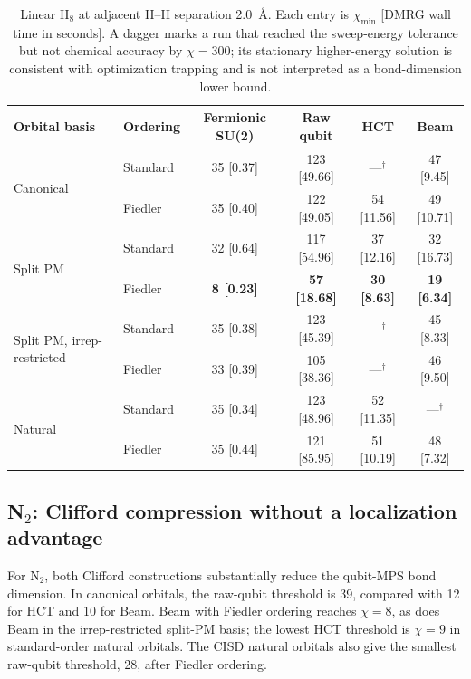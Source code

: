 \documentclass[a4paper,onecolumn,10pt]{article}
\begin{document}
\begin{table}[htbp]
\centering
\caption{Linear H$_8$ at adjacent H--H separation 2.0~\AA.  Each entry is
$\chi_{\min}$ [DMRG wall time in seconds].  A dagger marks a run that reached
the sweep-energy tolerance but not chemical accuracy by $\chi=300$; its
stationary higher-energy solution is consistent with optimization trapping
and is not interpreted as a bond-dimension lower bound.}
\label{tab:h8-orbital-dmrg}
\begin{tabular}{llcccc}
\toprule
Orbital basis & Ordering & Fermionic SU(2) & Raw qubit & HCT & Beam \\
\midrule
\multirow{2}{*}{Canonical}
 & Standard & 35 [0.37] & 123 [49.66] & ---$^\dagger$ & 47 [9.45] \\
 & Fiedler  & 35 [0.40] & 122 [49.05] & 54 [11.56] & 49 [10.71] \\
\midrule
\multirow{2}{*}{Split PM}
 & Standard & 32 [0.64] & 117 [54.96] & 37 [12.16] & 32 [16.73] \\
 & Fiedler  & \textbf{8 [0.23]} & \textbf{57 [18.68]}
             & \textbf{30 [8.63]} & \textbf{19 [6.34]} \\
\midrule
\multirow{2}{*}{Split PM, irrep-restricted}
 & Standard & 35 [0.38] & 123 [45.39] & ---$^\dagger$ & 45 [8.33] \\
 & Fiedler  & 33 [0.39] & 105 [38.36] & ---$^\dagger$ & 46 [9.50] \\
\midrule
\multirow{2}{*}{Natural}
 & Standard & 35 [0.34] & 123 [48.96] & 52 [11.35] & ---$^\dagger$ \\
 & Fiedler  & 35 [0.44] & 121 [85.95] & 51 [10.19] & 48 [7.32] \\
\bottomrule
\end{tabular}
\end{table}

\subsection{\texorpdfstring{N$_2$}{N2}: Clifford compression without a localization advantage}

For N$_2$, both Clifford constructions substantially reduce the qubit-MPS
bond dimension.  In canonical orbitals, the raw-qubit threshold is 39,
compared with 12 for HCT and 10 for Beam.  Beam with Fiedler ordering reaches
$\chi=8$, as does Beam in the irrep-restricted split-PM basis; the lowest HCT
threshold is $\chi=9$ in standard-order natural orbitals.  The CISD natural
orbitals also give the smallest raw-qubit threshold, 28, after Fiedler
ordering.
\end{document}
